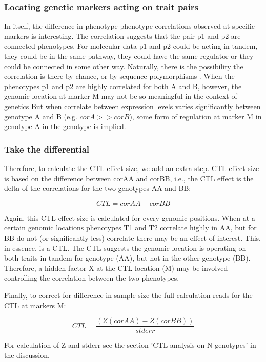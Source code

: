   \subsubsection{Locating genetic markers acting on trait pairs}
  In itself, the difference in phenotype-phenotype correlations observed at specific markers is interesting. The correlation 
  suggests that the pair p1 and p2 are connected phenotypes. For molecular data p1 and p2 could be acting in tandem, they could 
  be in the same pathway, they could have the same regulator or they could be connected in some other way.
  Naturally, there is the possibility the correlation is there by chance, or by sequence polymorphisms \cite{Alberts:2007}.
  When the phenotypes p1 and p2 are highly correlated for both A and B, however, the genomic location at marker M may not be so
  meaningful in the context of genetics  But when correlate between expression levels varies significantly between genotype A 
  and B (e.g. $corA >> corB$), some form of regulation at marker M in genotype A in the genotype is implied.

  \subsubsection{Take the differential}
  Therefore, to calculate the CTL effect size, we add an extra step. CTL effect size is based on the difference between corAA and 
  corBB, i.e., the CTL effect is the delta of the correlations for the two genotypes AA and BB:

  $$ CTL = corAA - corBB $$

  Again, this CTL effect size is calculated for every genomic positions.  When at a certain genomic locations phenotypes T1 and T2 
  correlate highly in AA, but for BB do not (or significantly less) correlate there may be an effect of interest. This, in essence, 
  is a CTL. The CTL suggests the genomic location is operating on both traits in tandem for genotype (AA), but not in the other 
  genotype (BB). Therefore, a hidden factor X at the CTL location (M) may be involved controlling the correlation between the two 
  phenotypes.

  Finally, to correct for difference in sample size the full calculation reads for the CTL at markers M:
  
  $$  CTL = \frac{(Z(corAA) - Z(corBB))}{stderr} $$

  For calculation of Z and stderr see the section 'CTL analysis on N-genotypes' in the discussion.

